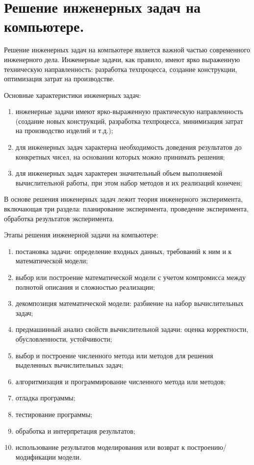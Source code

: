 \section{Решение инженерных задач на компьютере.}

Решение инженерных задач на компьютере является важной частью современного инженерного дела. Инженерные задачи, как правило, имеют ярко выраженную техническую направленность: разработка техпроцесса, создание конструкции, оптимизация затрат на производстве.

Основные характеристики инженерных задач:
\begin{enumerate}
  \item инженерные задачи имеют ярко-выраженную практическую направленность (создание новых конструкций, разработка техпроцесса, минимизация затрат на производство изделий и т.д.);
  \item для инженерных задач характерна необходимость доведения результатов до конкретных чисел, на основании которых можно принимать решения;
  \item для инженерных задач характерен значительный объем выполняемой вычислительной работы, при этом набор методов и их реализаций конечен;
\end{enumerate}

В основе решения инженерных задач лежит теория инженерного эксперимента, включающая три раздела: планирование эксперимента, проведение эксперимента, обработка результатов эксперимента.

Этапы решения инженерной задачи на компьютере:
\begin{enumerate}
  \item постановка задачи: определение входных данных, требований к ним и к математической модели;
  \item выбор или построение математической модели с учетом компромисса между полнотой описания и сложностью реализации;
  \item декомпозиция математической модели: разбиение на набор вычислительных задач;
  \item предмашинный анализ свойств вычислительной задачи: оценка корректности, обусловленности, устойчивости;
  \item выбор и построение численного метода или методов для решения выделенных вычислительных задач;
  \item алгоритмизация и программирование численного метода или методов;
  \item отладка программы;
  \item тестирование программы;
  \item обработка и интерпретация результатов;
  \item использование результатов моделирования или возврат к построению/модификации модели.
\end{enumerate}

\clearpage
